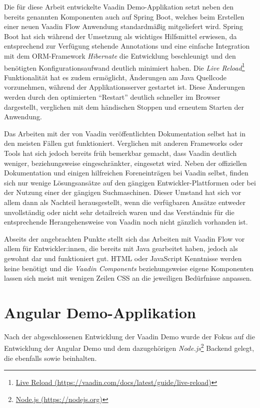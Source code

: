 \documentclass[a4paper,12pt,twoside]{scrreprt}
\begin{document}
Die für diese Arbeit entwickelte Vaadin Demo-Applikation setzt neben den bereits genannten Komponenten auch auf Spring Boot, welches beim Erstellen einer neuen Vaadin Flow Anwendung standardmäßig mitgeliefert wird. Spring Boot hat sich während der Umsetzung als wichtiges Hilfsmittel erwiesen, da entsprechend zur Verfügung stehende Annotations und eine einfache Integration mit dem ORM-Framework \textit{Hibernate} die Entwicklung beschleunigt und den benötigten Konfigurationsaufwand deutlich minimiert haben. Die \textit{Live Reload}\footnote{\href{https://vaadin.com/docs/latest/guide/live-reload}{Live Reload (https://vaadin.com/docs/latest/guide/live-reload)}} Funktionalität hat es zudem ermöglicht, Änderungen am Java Quellcode vorzunehmen, während der Applikationsserver gestartet ist. Diese Änderungen werden durch den optimierten \enquote{Restart} deutlich schneller im Browser dargestellt, verglichen mit dem händischen Stoppen und erneutem Starten der Anwendung.

\medskip

Das Arbeiten mit der von Vaadin veröffentlichten Dokumentation selbst hat in den meisten Fällen gut funktioniert. Verglichen mit anderen Frameworks oder Tools hat sich jedoch bereits früh bemerkbar gemacht, dass Vaadin deutlich weniger, beziehungsweise eingeschränkter, eingesetzt wird. Neben der offiziellen Dokumentation und einigen hilfreichen Foreneinträgen bei Vaadin selbst, finden sich nur wenige Lösungsansätze auf den gängigen Entwickler-Plattformen oder bei der Nutzung einer der gängigen Suchmaschinen. Dieser Umstand hat sich vor allem dann als Nachteil herausgestellt, wenn die verfügbaren Ansätze entweder unvollständig oder nicht sehr detailreich waren und das Verständnis für die entsprechende Herangehensweise von Vaadin noch nicht gänzlich vorhanden ist.

\medskip

Abseits der angebrachten Punkte stellt sich das Arbeiten mit Vaadin Flow vor allem für Entwickler:innen, die bereits mit Java gearbeitet haben, jedoch als gewohnt dar und funktioniert gut. HTML oder JavaScript Kenntnisse werden keine benötigt und die \textit{Vaadin Components} beziehungsweise eigene Komponenten lassen sich meist mit wenigen Zeilen \ac{CSS} an die jeweiligen Bedürfnisse anpassen.

\section{Angular Demo-Applikation}
\label{sec:angular-demo}
Nach der abgeschlossenen Entwicklung der Vaadin Demo wurde der Fokus auf die Entwicklung der Angular Demo und dem dazugehörigen \textit{Node.js}\footnote{\href{https://https://nodejs.org/}{Node.js (https://nodejs.org)}} Backend gelegt, die ebenfalls \textit{} sowie \textit{} beinhalten.
\end{document}
